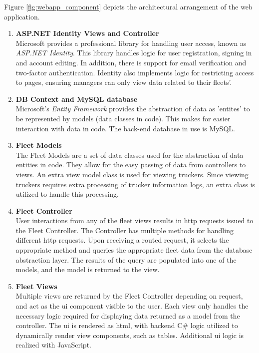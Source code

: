 Figure \ref{fig:webapp_component} depicts the architectural arrangement of the web application.
\begin{enumerate}
\item \textbf{ASP.NET Identity Views and Controller}\\
Microsoft provides a professional library for handling user access, known as \textit{ASP.NET Identity}.
This library handles logic for user registration, signing in and account editing.
In addition, there is support for email verification and two-factor authentication.
Identity also implements logic for restricting access to pages, ensuring managers can only view data related to their fleets'.

\item \textbf{DB Context and MySQL database}\\
Microsoft's \textit{Entity Framework} provides the abstraction of data as 'entites' to be represented by models (data classes in code).
This makes for easier interaction with data in code.
The back-end database in use is MySQL.\\

\item \textbf{Fleet Models}\\
The Fleet Models are a set of data classes used for the abstraction of data entities in code.
They allow for the easy passing of data from controllers to views.
An extra view model class is used for viewing truckers.
Since viewing truckers requires extra processing of trucker information logs, an extra class is utilized to handle this processing.

\item \textbf{Fleet Controller}\\
User interactions from any of the fleet views results in \ac{http} requests issued to the Fleet Controller.
The Controller has multiple methods for handling different \ac{http} requests.
Upon receiving a routed request, it selects the appropriate method and queries the appropriate fleet data from the database abstraction layer.
The results of the query are populated into one of the models, and the model is returned to the view.

\item \textbf{Fleet Views}\\
Multiple views are returned by the Fleet Controller depending on request, and act as the \ac{ui} component visible to the user.
Each view only handles the necessary logic required for displaying data returned as a model from the controller.
The \ac{ui} is rendered as \ac{html}, with backend C\# logic utilized to dynamically render view components, such as tables.
Additional \ac{ui} logic is realized with JavaScript.


\end{enumerate}
